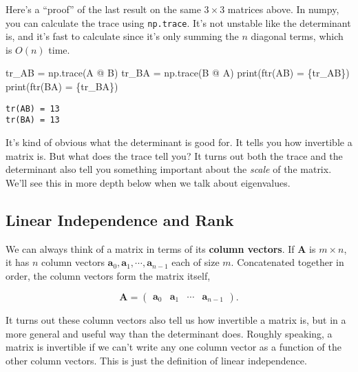 \documentclass[
  letterpaper,
  DIV=11,
  numbers=noendperiod]{scrreprt}
\newenvironment{Shaded}{\begin{snugshade}}{\end{snugshade}}
\newcommand{\BuiltInTok}[1]{\textcolor[rgb]{0.00,0.23,0.31}{#1}}
\newcommand{\NormalTok}[1]{\textcolor[rgb]{0.00,0.23,0.31}{#1}}
\newcommand{\OperatorTok}[1]{\textcolor[rgb]{0.37,0.37,0.37}{#1}}
\newcommand{\SpecialCharTok}[1]{\textcolor[rgb]{0.37,0.37,0.37}{#1}}
\newcommand{\SpecialStringTok}[1]{\textcolor[rgb]{0.13,0.47,0.30}{#1}}
\begin{document}
Here's a ``proof'' of the last result on the same \(3 \times 3\)
matrices above. In numpy, you can calculate the trace using
\texttt{np.trace}. It's not unstable like the determinant is, and it's
fast to calculate since it's only summing the \(n\) diagonal terms,
which is \(O(n)\) time.

\begin{Shaded}
\begin{Highlighting}[]
\NormalTok{tr\_AB }\OperatorTok{=}\NormalTok{ np.trace(A }\OperatorTok{@}\NormalTok{ B)}
\NormalTok{tr\_BA }\OperatorTok{=}\NormalTok{ np.trace(B }\OperatorTok{@}\NormalTok{ A)}
\BuiltInTok{print}\NormalTok{(}\SpecialStringTok{f\textquotesingle{}tr(AB) = }\SpecialCharTok{\{}\NormalTok{tr\_AB}\SpecialCharTok{\}}\SpecialStringTok{\textquotesingle{}}\NormalTok{)}
\BuiltInTok{print}\NormalTok{(}\SpecialStringTok{f\textquotesingle{}tr(BA) = }\SpecialCharTok{\{}\NormalTok{tr\_BA}\SpecialCharTok{\}}\SpecialStringTok{\textquotesingle{}}\NormalTok{)}
\end{Highlighting}
\end{Shaded}

\begin{verbatim}
tr(AB) = 13
tr(BA) = 13
\end{verbatim}

It's kind of obvious what the determinant is good for. It tells you how
invertible a matrix is. But what does the trace tell you? It turns out
both the trace and the determinant also tell you something important
about the \emph{scale} of the matrix. We'll see this in more depth below
when we talk about eigenvalues.

\hypertarget{linear-independence-and-rank}{%
\subsection{Linear Independence and
Rank}\label{linear-independence-and-rank}}

We can always think of a matrix in terms of its \textbf{column vectors}.
If \(\mathbf{A}\) is \(m \times n\), it has \(n\) column vectors
\(\mathbf{a}_0, \mathbf{a}_1, \cdots, \mathbf{a}_{n-1}\) each of size
\(m\). Concatenated together in order, the column vectors form the
matrix itself,

\[
\mathbf{A} = 
\begin{pmatrix}
\mathbf{a}_0 & \mathbf{a}_1 & \cdots & \mathbf{a}_{n-1}
\end{pmatrix}.
\]

It turns out these column vectors also tell us how invertible a matrix
is, but in a more general and useful way than the determinant does.
Roughly speaking, a matrix is invertible if we can't write any one
column vector as a function of the other column vectors. This is just
the definition of linear independence.
\end{document}
